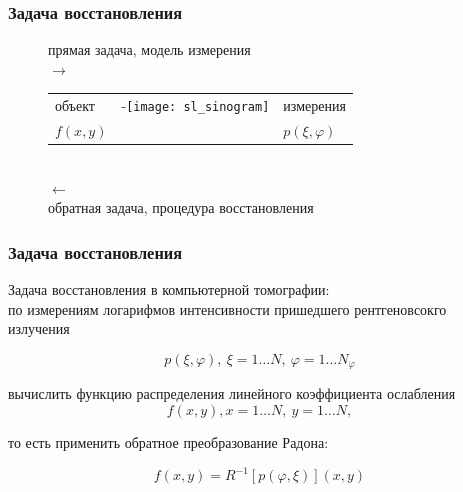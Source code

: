 \begin{frame}
\frametitle{Задача восстановления}
\begin{figure}
\centering
    прямая задача, модель измерения\\
    $\rightarrow$
    \\
    \begin{tabular}{p{} p{} p{}}
    \hspace{-1cm}
    \small{объект}
    &
    \hspace{-1cm} -\texttt{[image: sl\_sinogram]}
    &
    \hspace{-1cm} \small{измерения}
    \\
     \hspace{-1cm} \small{$f(x, y)$}
     &
    &
     \hspace{-1cm} \small{$p(\xi, \varphi)$}
    \end{tabular}
    \\
    $\leftarrow$ \\
    обратная задача, процедура восстановления
\end{figure}
\end{frame}

\begin{frame}
\frametitle{Задача восстановления}

Задача восстановления в компьютерной томографии: \\

по измерениям логарифмов интенсивности пришедшего рентгеновсокго излучения

$$
p(\xi, \varphi),\ \xi = 1 \dots N,\ \varphi = 1 \dots N_\varphi
$$

вычислить функцию распределения линейного коэффициента ослабления 
$$
f(x,y), x = 1 \dots N,\ y = 1 \dots N, 
$$

то есть применить обратное преобразование Радона:

$$
f(x,y) = R^{-1}[p(\varphi, \xi)](x,y)
$$

\end{frame}

